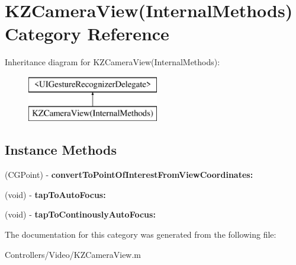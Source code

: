 \hypertarget{category_k_z_camera_view_07_internal_methods_08}{}\section{K\+Z\+Camera\+View(Internal\+Methods) Category Reference}
\label{category_k_z_camera_view_07_internal_methods_08}
Inheritance diagram for K\+Z\+Camera\+View(Internal\+Methods)\+:\begin{figure}[H]
\begin{center}
\leavevmode
\includegraphics[height=2.000000cm]{category_k_z_camera_view_07_internal_methods_08}
\end{center}
\end{figure}
\subsection*{Instance Methods}
\begin{DoxyCompactItemize}
\item 
\hypertarget{category_k_z_camera_view_07_internal_methods_08_a82753e99fc881e1378635bba75549939}{}(C\+G\+Point) -\/ {\bfseries convert\+To\+Point\+Of\+Interest\+From\+View\+Coordinates\+:}\label{category_k_z_camera_view_07_internal_methods_08_a82753e99fc881e1378635bba75549939}

\item 
\hypertarget{category_k_z_camera_view_07_internal_methods_08_abf1450179bbcce3ebbc23f53de315ab5}{}(void) -\/ {\bfseries tap\+To\+Auto\+Focus\+:}\label{category_k_z_camera_view_07_internal_methods_08_abf1450179bbcce3ebbc23f53de315ab5}

\item 
\hypertarget{category_k_z_camera_view_07_internal_methods_08_a6c1cd1918ab1f8b46bcf061f10a58886}{}(void) -\/ {\bfseries tap\+To\+Continously\+Auto\+Focus\+:}\label{category_k_z_camera_view_07_internal_methods_08_a6c1cd1918ab1f8b46bcf061f10a58886}

\end{DoxyCompactItemize}


The documentation for this category was generated from the following file\+:\begin{DoxyCompactItemize}
\item 
Controllers/\+Video/K\+Z\+Camera\+View.\+m\end{DoxyCompactItemize}
